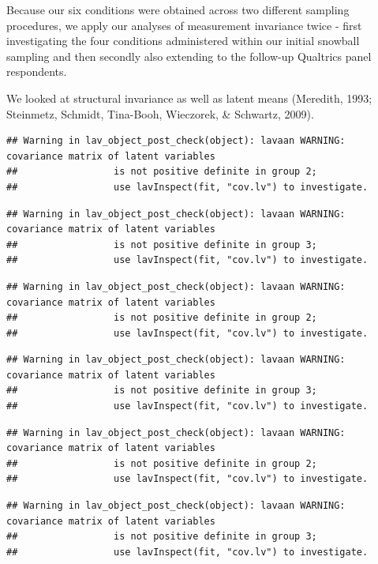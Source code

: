 \documentclass[
  man]{apa6}
\begin{document}
Because our six conditions were obtained across two different sampling procedures, we apply our analyses of measurement invariance twice - first investigating the four conditions administered within our initial snowball sampling and then secondly also extending to the follow-up Qualtrics panel respondents.

We looked at structural invariance as well as latent means (Meredith, 1993; Steinmetz, Schmidt, Tina-Booh, Wieczorek, \& Schwartz, 2009).

\begin{verbatim}
## Warning in lav_object_post_check(object): lavaan WARNING: covariance matrix of latent variables
##                 is not positive definite in group 2;
##                 use lavInspect(fit, "cov.lv") to investigate.
\end{verbatim}

\begin{verbatim}
## Warning in lav_object_post_check(object): lavaan WARNING: covariance matrix of latent variables
##                 is not positive definite in group 3;
##                 use lavInspect(fit, "cov.lv") to investigate.
\end{verbatim}

\begin{verbatim}
## Warning in lav_object_post_check(object): lavaan WARNING: covariance matrix of latent variables
##                 is not positive definite in group 2;
##                 use lavInspect(fit, "cov.lv") to investigate.
\end{verbatim}

\begin{verbatim}
## Warning in lav_object_post_check(object): lavaan WARNING: covariance matrix of latent variables
##                 is not positive definite in group 3;
##                 use lavInspect(fit, "cov.lv") to investigate.
\end{verbatim}

\begin{verbatim}
## Warning in lav_object_post_check(object): lavaan WARNING: covariance matrix of latent variables
##                 is not positive definite in group 2;
##                 use lavInspect(fit, "cov.lv") to investigate.
\end{verbatim}

\begin{verbatim}
## Warning in lav_object_post_check(object): lavaan WARNING: covariance matrix of latent variables
##                 is not positive definite in group 3;
##                 use lavInspect(fit, "cov.lv") to investigate.
\end{verbatim}
\end{document}
